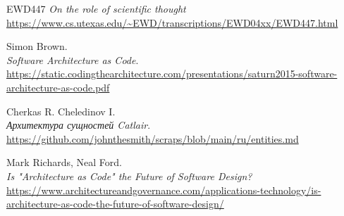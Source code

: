 \documentclass[final]{article}
\begin{document}
    \renewcommand{\refname}{References}
    \begin{thebibliography}{9}

         EWD447
        \textit{On the role of scientific thought}
        \url{https://www.cs.utexas.edu/~EWD/transcriptions/EWD04xx/EWD447.html}

        Simon Brown.\\
        \textit{Software Architecture as Code}.\\
        \url{https://static.codingthearchitecture.com/presentations/saturn2015-software-architecture-as-code.pdf}

        Cherkas R. Cheledinov I.\\
        \textit{Архитектура сущностей Catlair}.\\
        \url{https://github.com/johnthesmith/scraps/blob/main/ru/entities.md}

        Mark Richards, Neal Ford.\\
        \textit{Is "Architecture as Code" the Future of Software Design?}\\
        \url{https://www.architectureandgovernance.com/applications-technology/is-architecture-as-code-the-future-of-software-design/}

    \end{thebibliography}
\end{document}
